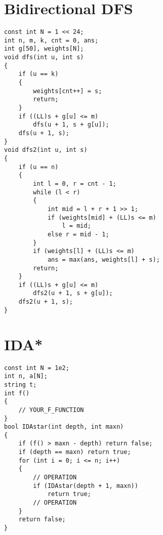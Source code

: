 \section{Bidirectional DFS}
\begin{lstlisting}
const int N = 1 << 24;
int n, m, k, cnt = 0, ans;
int g[50], weights[N];
void dfs(int u, int s)
{
    if (u == k)
    {
        weights[cnt++] = s;
        return;
    }
    if ((LL)s + g[u] <= m)
        dfs(u + 1, s + g[u]);
    dfs(u + 1, s);
}
void dfs2(int u, int s)
{
    if (u == n)
    {
        int l = 0, r = cnt - 1;
        while (l < r)
        {
            int mid = l + r + 1 >> 1;
            if (weights[mid] + (LL)s <= m)
                l = mid;
            else r = mid - 1;
        }
        if (weights[l] + (LL)s <= m)
            ans = max(ans, weights[l] + s);
        return;
    }
    if ((LL)s + g[u] <= m)
        dfs2(u + 1, s + g[u]);
    dfs2(u + 1, s);
}
\end{lstlisting}
\section{IDA*}
\begin{lstlisting}
const int N = 1e2;
int n, a[N];
string t;
int f()
{
    // YOUR_F_FUNCTION
}
bool IDAstar(int depth, int maxn)
{
    if (f() > maxn - depth) return false;
    if (depth == maxn) return true;
    for (int i = 0; i <= n; i++)
    {
        // OPERATION
        if (IDAstar(depth + 1, maxn))
            return true;
        // OPERATION
    }
    return false;
}
\end{lstlisting}
